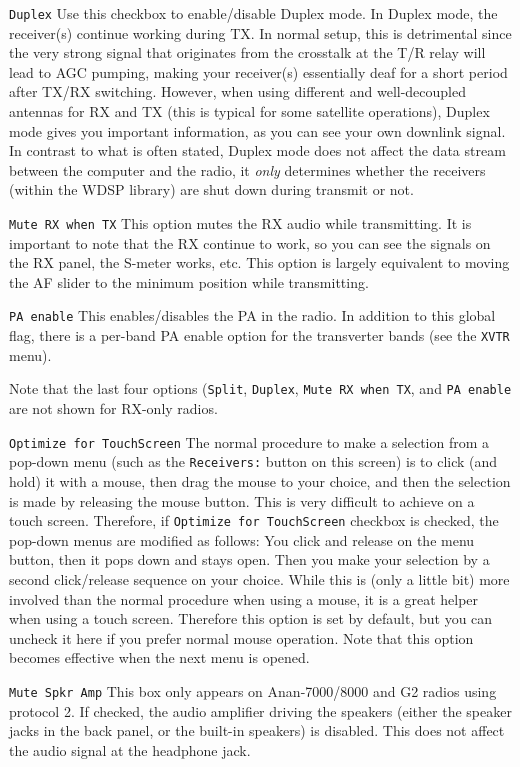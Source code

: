 \documentclass[12pt]{book}
\def\rett#1{\texttt{\color{red}#1}}
\def\bltt#1{\texttt{\color{blue}#1}}
\begin{document}
\rett{Duplex} Use this checkbox to enable/disable Duplex mode. In Duplex mode, the receiver(s)
continue working during TX. In normal setup, this is detrimental since the very strong
signal that originates from the crosstalk at the T/R relay will lead to AGC pumping,
making your receiver(s) essentially deaf for a short period after TX/RX switching.
However, when using different and well-decoupled antennas for RX and TX (this is typical
for some satellite operations), Duplex mode gives you important information, as you can
see your own downlink signal. In contrast to what is often stated, Duplex mode does not
affect the data stream between the computer and the radio, it \textit{only} determines
whether the receivers (within the WDSP library) are shut down during transmit or not.

\rett{Mute RX when TX} This option mutes the RX audio while transmitting. It is important
to note that the RX continue to work, so you can see the signals on the RX panel, the
S-meter works, etc. This option is largely equivalent to moving the AF slider to the
minimum position while transmitting.

\rett{PA enable} This enables/disables the PA in the radio. In addition to this global
flag, there is a per-band PA enable option for the transverter bands (see the \bltt{XVTR}
menu).

Note that the last four options (\rett{Split}, \rett{Duplex}, \rett{Mute RX when TX},
and \rett{PA enable} are not shown for RX-only radios.

\rett{Optimize for TouchScreen} The normal procedure to make a selection from a
pop-down menu (such as the \rett{Receivers:} button on this screen) is to click
(and hold) it with a mouse, then drag the mouse to your choice, and then the selection
is made by releasing the mouse button. This is very difficult to achieve on a touch
screen. Therefore, if \rett{Optimize for TouchScreen} checkbox is checked, the pop-down
menus are modified as follows: You click and release on the menu button, then it pops
down and stays open. Then you make your selection by a second click/release sequence
on your choice. While this is (only a little bit) more involved than the normal procedure
when using a mouse, it is a great helper when using a touch screen. Therefore this
option is set by default, but you can uncheck it here if you prefer normal
mouse operation. Note that this option becomes effective when the next menu is opened.

\rett{Mute Spkr Amp} This box only appears on Anan-7000/8000 and G2 radios using protocol 2.
If checked, the audio amplifier driving the speakers (either the speaker jacks in the
back panel, or the built-in speakers) is disabled. This does not affect the audio signal
at the headphone jack.
\end{document}
